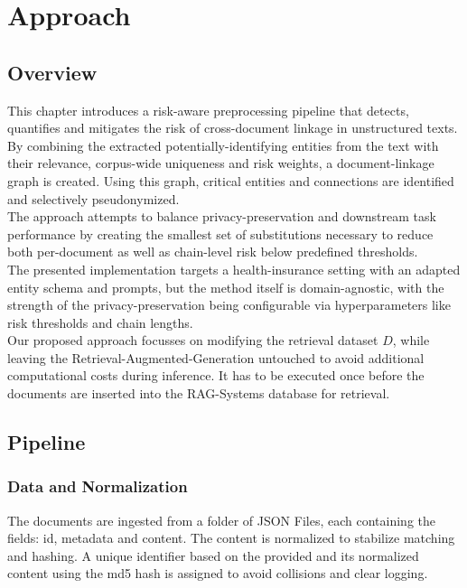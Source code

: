 \chapter{Approach}\label{chapter:approach}
\section{Overview}
This chapter introduces a risk-aware preprocessing pipeline that detects, quantifies and mitigates the risk of cross-document linkage in unstructured texts. By combining the extracted potentially-identifying entities from the text with their relevance, corpus-wide uniqueness and risk weights, a document-linkage graph is created. Using this graph, critical entities and connections are identified and selectively pseudonymized.\\The approach attempts to balance privacy-preservation and downstream task performance by creating the smallest set of substitutions necessary to reduce both per-document as well as chain-level risk below predefined thresholds. \\
The presented implementation targets a health-insurance setting with an adapted entity schema and prompts, but the method itself is domain-agnostic, with the strength of the privacy-preservation being configurable via hyperparameters like risk thresholds and chain lengths.\\
Our proposed approach focusses on modifying the retrieval dataset $D$, while leaving the Retrieval-Augmented-Generation untouched to avoid additional computational costs during inference. It has to be executed once before the documents are inserted into the RAG-Systems database for retrieval.



\section{Pipeline}
\subsection{Data and Normalization}
The documents are ingested from a folder of JSON Files, each containing the fields: id, metadata and content. The content is normalized to stabilize matching and hashing. A unique identifier based on the provided and its normalized content using the md5 hash is assigned to avoid collisions and clear logging.

